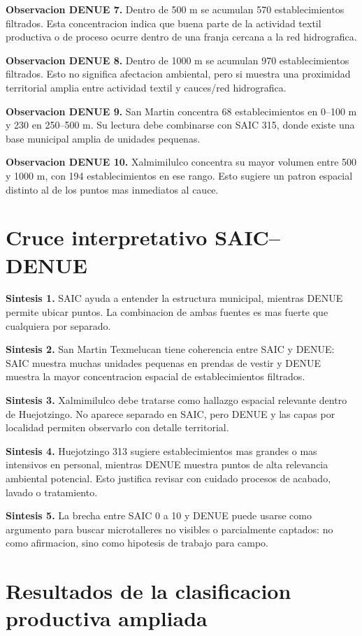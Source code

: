 \documentclass[11pt,letterpaper]{article}
\begin{document}
\textbf{Observacion DENUE 7.} Dentro de 500 m se acumulan 570 establecimientos filtrados. Esta concentracion indica que buena parte de la actividad textil productiva o de proceso ocurre dentro de una franja cercana a la red hidrografica.

\textbf{Observacion DENUE 8.} Dentro de 1000 m se acumulan 970 establecimientos filtrados. Esto no significa afectacion ambiental, pero si muestra una proximidad territorial amplia entre actividad textil y cauces/red hidrografica.

\textbf{Observacion DENUE 9.} San Martin concentra 68 establecimientos en 0--100 m y 230 en 250--500 m. Su lectura debe combinarse con SAIC 315, donde existe una base municipal amplia de unidades pequenas.

\textbf{Observacion DENUE 10.} Xalmimilulco concentra su mayor volumen entre 500 y 1000 m, con 194 establecimientos en ese rango. Esto sugiere un patron espacial distinto al de los puntos mas inmediatos al cauce.

\section{Cruce interpretativo SAIC--DENUE}

\textbf{Sintesis 1.} SAIC ayuda a entender la estructura municipal, mientras DENUE permite ubicar puntos. La combinacion de ambas fuentes es mas fuerte que cualquiera por separado.

\textbf{Sintesis 2.} San Martin Texmelucan tiene coherencia entre SAIC y DENUE: SAIC muestra muchas unidades pequenas en prendas de vestir y DENUE muestra la mayor concentracion espacial de establecimientos filtrados.

\textbf{Sintesis 3.} Xalmimilulco debe tratarse como hallazgo espacial relevante dentro de Huejotzingo. No aparece separado en SAIC, pero DENUE y las capas por localidad permiten observarlo con detalle territorial.

\textbf{Sintesis 4.} Huejotzingo 313 sugiere establecimientos mas grandes o mas intensivos en personal, mientras DENUE muestra puntos de alta relevancia ambiental potencial. Esto justifica revisar con cuidado procesos de acabado, lavado o tratamiento.

\textbf{Sintesis 5.} La brecha entre SAIC 0 a 10 y DENUE puede usarse como argumento para buscar microtalleres no visibles o parcialmente captados: no como afirmacion, sino como hipotesis de trabajo para campo.

\section{Resultados de la clasificacion productiva ampliada}
\end{document}
